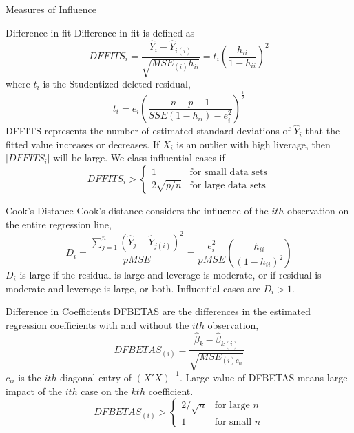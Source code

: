 \documentclass{article}
\begin{document}
\begin{multicols*}{3}
    \begin{blackbox}{Measures of Influence}
        \begin{redbox}{Difference in fit}
            Difference in fit is defined as \\[-2ex]
            \[DFFITS_i = \frac{\hat{Y}_i - \hat{Y}_{i(i)}}{\sqrt{MSE_{(i)}h_{ii}}} = t_i \left(\frac{h_{ii}}{1-h_{ii}}\right)^2\]
            where $t_i$ is the Studentized deleted residual, \\[-2ex]
            \[t_i = e_i\left(\frac{n-p-1}{SSE(1-h_{ii})-e_i^2}\right)^{\frac{1}{2}}\]
            DFFITS represents the number of estimated standard deviations of $\hat{Y}_i$ that the fitted value increases or decreases. If $X_i$ is an outlier with high liverage, then $|DFFITS_i|$ will be large. We class influential cases if\\[-4ex]
            \[DFFITS_i > \begin{cases}
                1 & \text{for small data sets}\\
                2\sqrt{p/n} & \text{for large data sets}
            \end{cases}\]            
        \end{redbox}
        \begin{bluebox}{Cook's Distance}
            Cook's distance considers the influence of the $ith$ observation on the entire regression line, \\[-2ex]
            \[D_i = \frac{\sum_{j=1}^n (\hat{Y}_j - \hat{Y}_{j(i)})^2}{pMSE} = \frac{e_i^2}{pMSE}\left(\frac{h_{ii}}{(1-h_{ii})^2}\right)\]
            $D_i$ is large if the residual is large and leverage is moderate, or if residual is moderate and leverage is large, or both. Influential cases are $D_i > 1$.
        \end{bluebox}
        \begin{brownbox}{Difference in Coefficients}
            DFBETAS are the differences in the estimated regression coefficients with and without the $ith$ observation, \\[-4ex]
            \[DFBETAS_{(i)} = \frac{\hat{\beta}_k - \hat{\beta}_{k(i)}}{\sqrt{MSE_{(i)c_{ii}}}}\]
            $c_{ii}$ is the $ith$ diagonal entry of $(X'X)^{-1}$. Large value of DFBETAS means large impact of the $ith$ case on the $kth$ coefficient. \\[-2ex]
            \[DFBETAS_{(i)} > \begin{cases}
                2/\sqrt{n} & \text{for large $n$}\\
                1 & \text{for small $n$}

\end{cases}\]
\end{brownbox}
\end{blackbox}
\end{multicols*}
\end{document}
